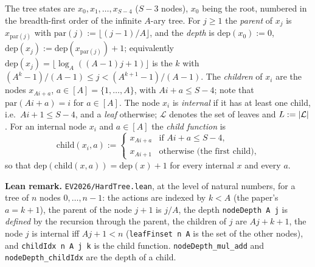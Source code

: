 \begin{definition}\label{def:hard_tree}
\leanok
The tree states are $x_0, x_1, \dots, x_{S-4}$ ($S - 3$ nodes), $x_0$ being the root, numbered in
the breadth-first order of the infinite $A$-ary tree. For $j \ge 1$ the \emph{parent} of $x_j$ is
$x_{\mathrm{par}(j)}$ with $\mathrm{par}(j) := \lfloor (j - 1)/A \rfloor$, and the \emph{depth} is
$\mathrm{dep}(x_0) := 0$, $\mathrm{dep}(x_j) := \mathrm{dep}(x_{\mathrm{par}(j)}) + 1$; equivalently
$\mathrm{dep}(x_j) = \lfloor \log_A((A-1)j + 1)\rfloor$ is the $k$ with
$(A^k - 1)/(A-1) \le j < (A^{k+1} - 1)/(A-1)$. The \emph{children} of $x_i$ are the nodes
$x_{Ai + a}$, $a \in [A] = \{1, \dots, A\}$, with $Ai + a \le S - 4$; note that
$\mathrm{par}(Ai + a) = i$ for $a \in [A]$. The node $x_i$ is \emph{internal} if it has at least
one child, i.e.\ $Ai + 1 \le S - 4$, and a \emph{leaf} otherwise; $\mathcal L$ denotes the set of
leaves and $L := \lvert \mathcal L \rvert$. For an internal node $x_i$ and $a \in [A]$ the \emph{child
function} is
\[
  \mathrm{child}(x_i, a) := \begin{cases} x_{Ai + a} & \text{if } Ai + a \le S - 4, \\ x_{Ai + 1} & \text{otherwise (the first child),}\end{cases}
\]
so that $\mathrm{dep}(\mathrm{child}(x, a)) = \mathrm{dep}(x) + 1$ for every internal $x$ and every $a$.
\end{definition}

\textbf{Lean remark.} \texttt{EV2026/HardTree.lean}, at the level of natural numbers, for a tree of
$n$ nodes $0, \dots, n - 1$: the actions are indexed by $k < A$ (the paper's $a = k + 1$), the parent of
the node $j + 1$ is $j / A$, the depth \texttt{nodeDepth A j} is \emph{defined} by the recursion through the
parent, the children of $j$ are $Aj + k + 1$, the node $j$ is internal iff $Aj + 1 < n$
(\texttt{leafFinset n A} is the set of the other nodes), and \texttt{childIdx n A j k} is the child
function. \texttt{nodeDepth\_mul\_add} and \texttt{nodeDepth\_childIdx} are the depth of a child.

